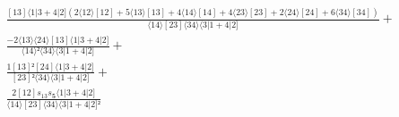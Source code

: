 \documentclass[varwidth, border=5pt]{standalone}
\begin{document}
\begin{my}
$\begin{gathered}
\scriptscriptstyle\frac{[13]⟨1|3+4|2](2⟨12⟩[12]+5⟨13⟩[13]+4⟨14⟩[14]+4⟨23⟩[23]+2⟨24⟩[24]+6⟨34⟩[34])}{⟨14⟩[23]⟨34⟩⟨3|1+4|2]} +\\
\scriptscriptstyle\frac{-2⟨13⟩⟨24⟩[13]⟨1|3+4|2]}{⟨14⟩²⟨34⟩⟨3|1+4|2]} +\\
\scriptscriptstyle\frac{1[13]²[24]⟨1|3+4|2]}{[23]²⟨34⟩⟨3|1+4|2]} +\\
\scriptscriptstyle\frac{2[12]s_{13}s_{𝟓}⟨1|3+4|2]}{⟨14⟩[23]⟨34⟩⟨3|1+4|2]²} \phantom{+}
\end{gathered}$
\end{my}
\end{document}
